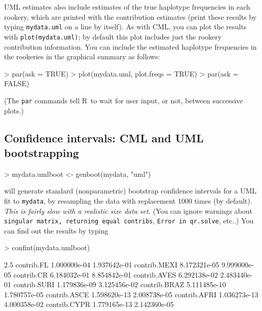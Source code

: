 \documentclass[11pt]{article}
\newcommand{\R}{{\sf R}}
\begin{document}
UML estimates also include estimates of the true
haplotype frequencies in each rookery, which are
printed with the contribution estimates 
(print these results by typing {\tt mydata.uml} on a line by
itself).
As with CML, you can plot the results with
{\tt plot(mydata.uml)}; by default this plot
includes just the rookery contribution
information.
You can include the estimated haplotype
frequencies in the rookeries in the graphical summary as follows:
\begin{Schunk}
\begin{Sinput}
> par(ask = TRUE)
> plot(mydata.uml, plot.freqs = TRUE)
> par(ask = FALSE)
\end{Sinput}
\end{Schunk}
(The {\tt par} commands tell \R\ to wait
for user input, or not, between successive plots.)

\subsection{Confidence intervals:
CML and UML bootstrapping}
\begin{Schunk}
\begin{Sinput}
> mydata.umlboot <- genboot(mydata, "uml")
\end{Sinput}
\end{Schunk}
will generate standard (nonparametric)
bootstrap confidence intervals for
a UML fit to {\tt mydata}, by resampling
the data with replacement 1000 times (by default).
\emph{This is fairly slow with a realistic size
data set.}
(You can ignore warnings about {\tt singular matrix, returning
equal contribs}, {\tt Error in qr.solve}, etc..)
You can find out the results by typing
\begin{Schunk}
\begin{Sinput}
> confint(mydata.umlboot)
\end{Sinput}
\begin{Soutput}
                     2.5%
contrib.FL   1.000000e-04 1.937642e-01
contrib.MEXI 8.172321e-05 9.999000e-05
contrib.CR   6.184032e-01 8.854842e-01
contrib.AVES 6.292138e-02 2.483440e-01
contrib.SURI 1.179836e-09 3.125456e-02
contrib.BRAZ 5.111485e-10 1.780757e-05
contrib.ASCE 1.598620e-13 2.008738e-05
contrib.AFRI 1.036273e-13 4.000358e-02
contrib.CYPR 1.779165e-13 2.142360e-05
\end{Soutput}
\end{Schunk}
\end{document}
